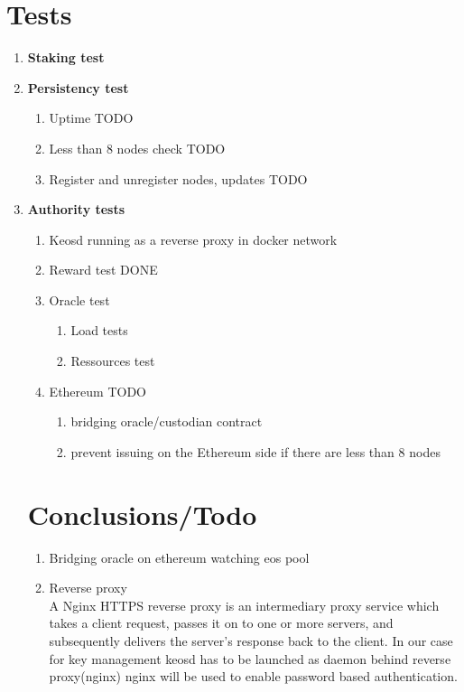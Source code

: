 \documentclass[]{article}
\begin{document}
 
\section{Tests}
					\begin{enumerate}
						\item \textbf{Staking test}
						
						\item \textbf{Persistency test}  
							\begin{enumerate}
								\item Uptime {\color{red} TODO}
								\item Less than 8 nodes check   {\color{red} TODO}
								\item Register and unregister nodes, updates  {\color{red} TODO}
							\end{enumerate}
						\item \textbf{Authority tests}
							\begin{enumerate}
							\item Keosd running as a reverse proxy in docker network
							\item Reward test	 {\color{green} DONE}
								
								\item Oracle test	
							\begin{enumerate}						
								\item Load tests
									\item Ressources test 	 			
							\end{enumerate}
							\item Ethereum {\color{red} TODO}  
						   \begin{enumerate}
						   		\item bridging oracle/custodian contract
						   	\item prevent issuing on the Ethereum side if there are less than 8 nodes 
						   	\end{enumerate}
						
				\end{enumerate}

\section{Conclusions/Todo}
\begin{enumerate}
		\item Bridging oracle on ethereum watching eos pool  
		\item Reverse proxy \\
		A Nginx HTTPS reverse proxy is an intermediary proxy service which takes a client request, passes it on to one or more servers, and subsequently delivers the server's response back to the client. 
		In our case for key management keosd has to be launched as daemon behind reverse proxy(nginx)
		nginx will be used to enable password based authentication.
		

\end{enumerate}
\end{enumerate}
\end{document}
